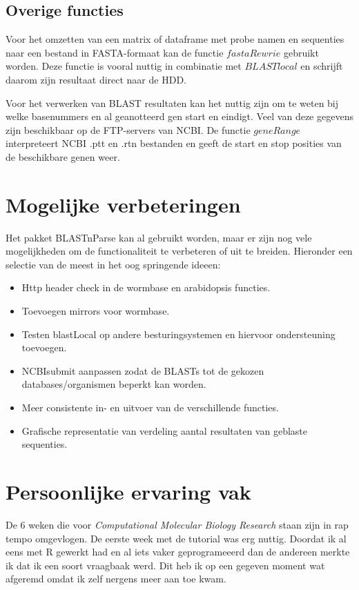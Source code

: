 \documentclass[10pt]{article}
\begin{document}
\subsection*{Overige functies}
Voor het omzetten van een matrix of dataframe met probe namen en sequenties naar een bestand in FASTA-formaat kan de functie $fastaRewrie$ gebruikt worden. Deze functie is vooral nuttig in combinatie met $BLASTlocal$ en schrijft daarom zijn resultaat direct naar de HDD.

Voor het verwerken van BLAST resultaten kan het nuttig zijn om te weten bij welke basenummers en al geanotteerd gen start en eindigt. Veel van deze gegevens zijn beschikbaar op de FTP-servers van NCBI\cite{NCBIftp}. De functie $geneRange$ interpreteert NCBI .ptt en .rtn bestanden en geeft de start en stop posities van de beschikbare genen weer.

\section*{Mogelijke verbeteringen}
Het pakket BLASTnParse kan al gebruikt worden, maar er zijn nog vele mogelijkheden om de functionaliteit te verbeteren of uit te breiden. Hieronder een selectie van de meest in het oog springende ideeen:
\begin{itemize}
\item Http header check in de wormbase en arabidopsis functies.
\item Toevoegen mirrors voor wormbase.
\item Testen blastLocal op andere besturingsystemen en hiervoor ondersteuning toevoegen.
\item NCBIsubmit aanpassen zodat de BLASTs tot de gekozen databases/organismen beperkt kan worden.
\item Meer consistente in- en uitvoer van de verschillende functies.
\item Grafische representatie van verdeling aantal resultaten van geblaste sequenties.
\end{itemize}

\section*{Persoonlijke ervaring vak}
De 6 weken die voor \emph{Computational Molecular Biology Research} staan zijn in rap tempo omgevlogen. De eerste week met de tutorial was erg nuttig. Doordat ik al eens met R gewerkt had en al iets vaker geprogrameeerd dan de andereen merkte ik dat ik een soort vraagbaak werd. Dit heb ik op een gegeven moment wat afgeremd omdat ik zelf nergens meer aan toe kwam.
\end{document}
